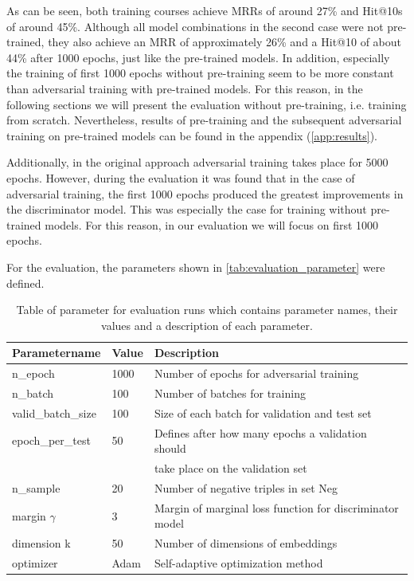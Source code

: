 As can be seen, both training courses achieve MRRs of around 27\% and Hit@10s of around 45\%.
Although all model combinations in the second case were not pre-trained, they also achieve an MRR of approximately 26\% and a Hit@10 of about 44\% after 1000 epochs, just like the pre-trained models.
In addition, especially the training of first 1000 epochs without pre-training seem to be more constant than adversarial training with pre-trained models.
For this reason, in the following sections we will present the evaluation without pre-training, i.e. training from scratch.
Nevertheless, results of pre-training and the subsequent adversarial training on pre-trained models can be found in the appendix (\autoref{app:results}).

Additionally, in the original approach adversarial training takes place for 5000 epochs.
However, during the evaluation it was found that in the case of adversarial training, the first 1000 epochs produced the greatest improvements in the discriminator model.
This was especially the case for training without pre-trained models.
For this reason, in our evaluation we will focus on first 1000 epochs.

For the evaluation, the parameters shown in \autoref{tab:evaluation_parameter} were defined.
\begin{table}[h]
    \centering
    \begin{tabular}{lll}
        \toprule
        
        \textbf{Parametername} & 
        \textbf{Value} & 
        \textbf{Description} \\
    
        \midrule
         n\_epoch & 1000 & Number of epochs for adversarial training\\
         n\_batch & 100 & Number of batches for training \\
         
         valid\_batch\_size & 100 & Size of each batch for validation and test set\\
         epoch\_per\_test & 50 & Defines after how many epochs a validation should \\
         &  & take place on the validation set \\
         n\_sample & 20 & Number of negative triples in set Neg \\

        margin $\gamma$ & 3 & Margin of marginal loss function for discriminator model\\
        dimension k & 50 & Number of dimensions of embeddings \\ 
        optimizer & Adam & Self-adaptive optimization method \\

        \bottomrule
    \end{tabular}
    \caption{Table of parameter for evaluation runs which contains parameter names, their values and a description of each parameter.}
\label{tab:evaluation_parameter}
\end{table}



  
  

